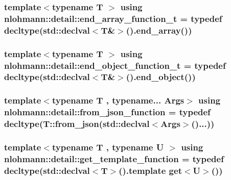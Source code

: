 \subsubsection[{\texorpdfstring{end\+\_\+array\+\_\+function\+\_\+t}{end_array_function_t}}]{\setlength{\rightskip}{0pt plus 5cm}template$<$typename T $>$ using {\bf nlohmann\+::detail\+::end\+\_\+array\+\_\+function\+\_\+t} = typedef decltype(std\+::declval$<$T\&$>$().end\+\_\+array())}\hypertarget{namespacenlohmann_1_1detail_aec53c029383b34a72182210e58fadb79}{}\label{namespacenlohmann_1_1detail_aec53c029383b34a72182210e58fadb79}
\subsubsection[{\texorpdfstring{end\+\_\+object\+\_\+function\+\_\+t}{end_object_function_t}}]{\setlength{\rightskip}{0pt plus 5cm}template$<$typename T $>$ using {\bf nlohmann\+::detail\+::end\+\_\+object\+\_\+function\+\_\+t} = typedef decltype(std\+::declval$<$T\&$>$().end\+\_\+object())}\hypertarget{namespacenlohmann_1_1detail_af52d6d2521c386998ae940d118182ebc}{}\label{namespacenlohmann_1_1detail_af52d6d2521c386998ae940d118182ebc}
\subsubsection[{\texorpdfstring{from\+\_\+json\+\_\+function}{from_json_function}}]{\setlength{\rightskip}{0pt plus 5cm}template$<$typename T , typename... Args$>$ using {\bf nlohmann\+::detail\+::from\+\_\+json\+\_\+function} = typedef decltype(T\+::from\+\_\+json(std\+::declval$<$Args$>$()...))}\hypertarget{namespacenlohmann_1_1detail_a1711ee5cef66a0523055c8d9f024f322}{}\label{namespacenlohmann_1_1detail_a1711ee5cef66a0523055c8d9f024f322}
\subsubsection[{\texorpdfstring{get\+\_\+template\+\_\+function}{get_template_function}}]{\setlength{\rightskip}{0pt plus 5cm}template$<$typename T , typename U $>$ using {\bf nlohmann\+::detail\+::get\+\_\+template\+\_\+function} = typedef decltype(std\+::declval$<$T$>$().template {\bf get}$<$U$>$())}\hypertarget{namespacenlohmann_1_1detail_ab4d22cdb6521ee3508db496dea66711e}{}\label{namespacenlohmann_1_1detail_ab4d22cdb6521ee3508db496dea66711e}
